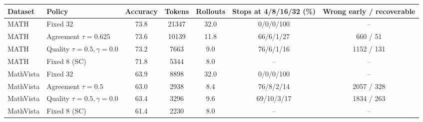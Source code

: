 \begin{tabular}{llccccc}\toprule Dataset & Policy & Accuracy & Tokens & Rollouts & Stops at 4/8/16/32 (\%) & Wrong early / recoverable \\ \midrule
MATH & Fixed 32 & 73.8 & 21347 & 32.0 & 0/0/0/100 & -- \\
MATH & Agreement $\tau{=}0.625$ & 73.6 & 10139 & 11.8 & 66/6/1/27 & 660 / 51 \\
MATH & Quality $\tau{=}0.5, \gamma{=}0.0$ & 73.2 & 7663 & 9.0 & 76/6/1/16 & 1152 / 131 \\
MATH & Fixed 8 (SC) & 71.8 & 5344 & 8.0 & -- & -- \\ \midrule
MathVista & Fixed 32 & 63.9 & 8898 & 32.0 & 0/0/0/100 & -- \\
MathVista & Agreement $\tau{=}0.5$ & 63.0 & 2938 & 8.4 & 76/8/2/14 & 2057 / 328 \\
MathVista & Quality $\tau{=}0.5, \gamma{=}0.0$ & 63.4 & 3296 & 9.6 & 69/10/3/17 & 1834 / 263 \\
MathVista & Fixed 8 (SC) & 61.4 & 2230 & 8.0 & -- & -- \\
\bottomrule\end{tabular}
